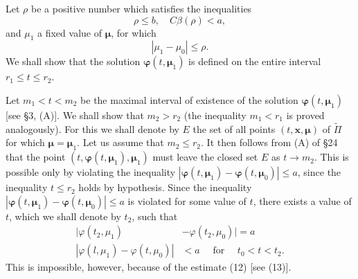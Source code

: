 \documentclass[10pt,a5paper]{book}
\makeatletter
\theoremstyle{plain}
\theoremstyle{definition}
\theoremstyle{remark}
\renewenvironment{proof}[1][\proofname]{\par
  \pushQED{\qed}%
  \normalfont\topsep6\p@\@plus6\p@\relax
  \trivlist
  \item\relax{\itshape #1\@addpunct{.}}\hspace\labelsep\ignorespaces
}{\popQED\endtrivlist\@endpefalse}
\makeatother
\begin{document}
\begin{proof}
Let $\rho$ be a positive number which satisfies the inequalities
\begin{equation*}
\rho \leq b, \quad C \beta(\rho)<a, \tag{13}
\end{equation*}
and $\mu_{1}$ a fixed value of $\boldsymbol{\mu}$, for which
\[
\left|\mu_{1}-\mu_{0}\right| \leq \rho .
\]
We shall show that the solution $\boldsymbol{\varphi}\left(t, \boldsymbol{\mu}_{1}\right)$ is defined on the entire interval $r_{1} \leq t \leq r_{2}$.

Let $m_{1}<t<m_{2}$ be the maximal interval of existence of the solution $\boldsymbol{\varphi}\left(t, \boldsymbol{\mu}_{1}\right)$ [see §3, (A)]. We shall show that $m_{2}>r_{2}$ (the inequality $m_{1}<r_{1}$ is proved analogously). For this we shall denote by $E$ the set of all points $(t, \mathbf{x}, \boldsymbol{\mu})$ of $\widetilde{\Pi}$ for which $\boldsymbol{\mu}=\boldsymbol{\mu}_{1}$. Let us assume that $m_{2} \leq r_{2}$. It then follows from (A) of §24 that the point $\left(t, \boldsymbol{\varphi}\left(t, \boldsymbol{\mu}_{1}\right), \boldsymbol{\mu}_{1}\right)$ must leave the closed set $E$ as $t \rightarrow m_{2}$. This is possible only by violating the inequality $\left|\boldsymbol{\varphi}\left(t, \boldsymbol{\mu}_{1}\right)-\boldsymbol{\varphi}\left(t, \boldsymbol{\mu}_{0}\right)\right| \leq a$, since the inequality $t \leq r_{2}$ holds by hypothesis. Since the inequality $\left|\boldsymbol{\varphi}\left(t, \boldsymbol{\mu}_{1}\right)-\boldsymbol{\varphi}\left(t, \boldsymbol{\mu}_{0}\right)\right| \leq a$ is violated for some value of $t$, there exists a value of $t$, which we shall denote by $t_{2}$, such that
\[
\begin{aligned}
\mid \varphi\left(t_{2}, \mu_{1}\right) & -\varphi\left(t_{2}, \mu_{0}\right) \mid=a \\
\left|\varphi\left(l, \mu_{1}\right)-\varphi\left(t, \mu_{0}\right)\right| & <a \quad \text { for } \quad t_{0}<t<t_{2} .
\end{aligned}
\]
This is impossible, however, because of the estimate (12) [see (13)].


\end{proof}
\end{document}
